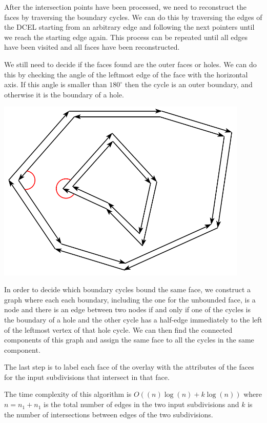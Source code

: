 \begin{minipage}{0.7\textwidth}

    After the intersection points have been processed, we need to reconstruct the faces by traversing the boundary cycles. We can do this by traversing the edges of the DCEL starting from an arbitrary edge and following the next pointers until we reach the starting edge again. This process can be repeated until all edges have been visited and all faces have been reconstructed.

    We still need to decide if the faces found are the outer faces or holes. We can do this by checking the angle of the leftmost edge of the face with the horizontal axis.  If this angle is smaller than $180^{\circ}$ then the cycle is an outer boundary, and otherwise it is the boundary of a hole.

\end{minipage}
\begin{minipage}{0.3\textwidth}
    \centering
    \includegraphics[width=0.9\textwidth]{images/hole.png}
\end{minipage}
\break

In order to decide which boundary cycles bound the same face, we construct a graph where each each boundary, including the one for the unbounded face, is a node and there is an edge between two nodes if and only if one of the cycles is the boundary of a hole and the other cycle has a half-edge immediately to the left of the leftmost vertex of that hole cycle. We can then find the connected components of this graph and assign the same face to all the cycles in the same component.

The last step is to label each face of the overlay with the attributes of the faces for the input subdivisions that intersect in that face.

The time complexity of this algorithm is $O((n)\log(n) + k \log(n))$ where $n = n_1 + n_1$ is the total number of edges in the two input subdivisions and $k$ is the number of intersections between edges of the two subdivisions.
